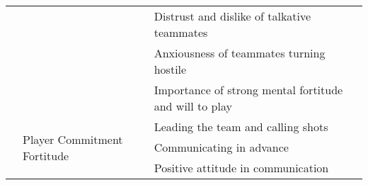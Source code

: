 \begin{table}[!htbp]
{\begin{tabular}{ll|l}
\multicolumn{1}{l|}{}                                                                                                                                                                                    &                                                                                                             & Distrust and dislike of talkative teammates                         \\ \cline{3-3} 
\multicolumn{1}{l|}{}                                                                                                                                                                                    &                                                                                                             & Anxiousness of teammates turning hostile                            \\ \cline{3-3} 
\multicolumn{1}{l|}{}                                                                                                                                                                                    &                                                                                                             & Importance of strong mental fortitude and will to play              \\ \cline{2-3} 
\multicolumn{1}{l|}{}                                                                                                                                                                                    & \multirow{3}{*}{Player Commitment Fortitude}                                                                & Leading the team and calling shots                                  \\ \cline{3-3} 
\multicolumn{1}{l|}{}                                                                                                                                                                                    &                                                                                                             & Communicating in advance                                            \\ \cline{3-3} 
\multicolumn{1}{l|}{}                                                                                                                                                                                    &                                                                                                             & Positive attitude in communication                                  \\ \hline

\end{tabular}}
\end{table}
